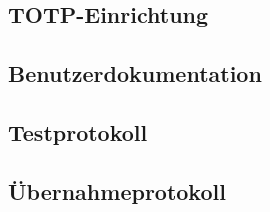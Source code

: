 \subsection{TOTP-Einrichtung}
\label{sec:TOTPConfig}

\subsection{Benutzerdokumentation}
\label{app:Benutzerdokumentation}

\subsection{Testprotokoll}
\label{app:Testprotokoll}

\subsection{Übernahmeprotokoll}
\label{app:Übernahmeprotokoll}
